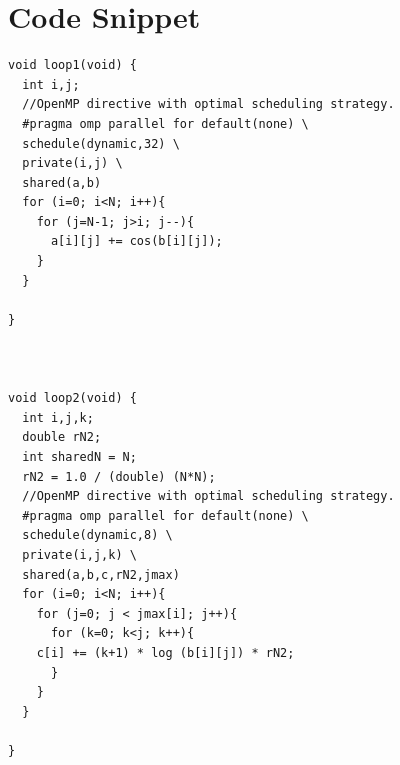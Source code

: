 \documentclass[a4paper,12pt]{article}
\begin{document}
\pagebreak
\section{Code Snippet}
\begin{verbatim}
void loop1(void) { 
  int i,j;
  //OpenMP directive with optimal scheduling strategy.
  #pragma omp parallel for default(none) \
  schedule(dynamic,32) \
  private(i,j) \
  shared(a,b)
  for (i=0; i<N; i++){ 
    for (j=N-1; j>i; j--){
      a[i][j] += cos(b[i][j]);
    } 
  }

} 



void loop2(void) {
  int i,j,k; 
  double rN2; 
  int sharedN = N;
  rN2 = 1.0 / (double) (N*N);  
  //OpenMP directive with optimal scheduling strategy.
  #pragma omp parallel for default(none) \
  schedule(dynamic,8) \
  private(i,j,k) \
  shared(a,b,c,rN2,jmax)
  for (i=0; i<N; i++){ 
    for (j=0; j < jmax[i]; j++){
      for (k=0; k<j; k++){ 
	c[i] += (k+1) * log (b[i][j]) * rN2;
      } 
    }
  }

}


\end{verbatim}
\end{document}

